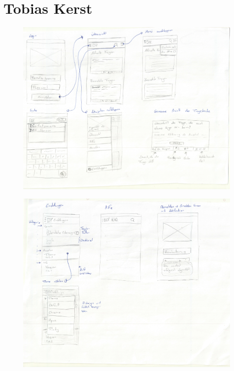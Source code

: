 \section{Tobias Kerst}
\label{sec:toby}

\begin{figure}
  \vspace{-20pt}
  \begin{center}
    \includegraphics[width=0.99\textwidth]{./images/entwuerfe/toby1}
  \end{center}
  \vspace{-40pt}
\end{figure}

\clearpage
\begin{figure}
  \vspace{-20pt}
  \begin{center}
    \includegraphics[width=0.99\textwidth]{./images/entwuerfe/toby2}
  \end{center}
  \vspace{-40pt}
\end{figure}


